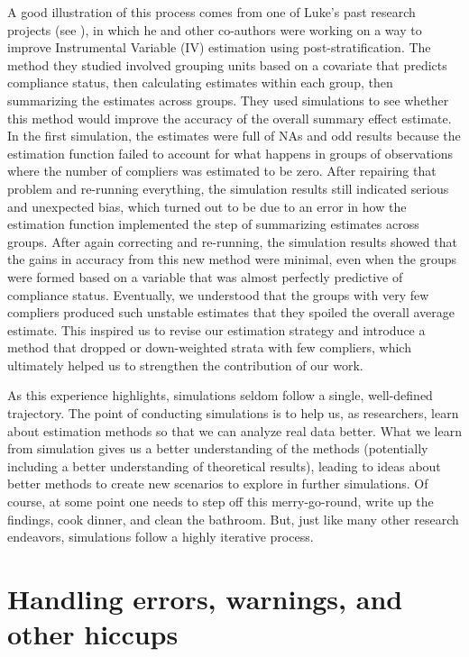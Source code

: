 \documentclass[
]{book}
\begin{document}
A good illustration of this process comes from one of Luke's past research projects (see \citet{pashley2024improving}), in which he and other co-authors were working on a way to improve Instrumental Variable (IV) estimation using post-stratification.
The method they studied involved grouping units based on a covariate that predicts compliance status, then calculating estimates within each group, then summarizing the estimates across groups.
They used simulations to see whether this method would improve the accuracy of the overall summary effect estimate.
In the first simulation, the estimates were full of NAs and odd results because the estimation function failed to account for what happens in groups of observations where the number of compliers was estimated to be zero.
After repairing that problem and re-running everything, the simulation results still indicated serious and unexpected bias, which turned out to be due to an error in how the estimation function implemented the step of summarizing estimates across groups.
After again correcting and re-running, the simulation results showed that the gains in accuracy from this new method were minimal, even when the groups were formed based on a variable that was almost perfectly predictive of compliance status.
Eventually, we understood that the groups with very few compliers produced such unstable estimates that they spoiled the overall average estimate.
This inspired us to revise our estimation strategy and introduce a method that dropped or down-weighted strata with few compliers, which ultimately helped us to strengthen the contribution of our work.

As this experience highlights, simulations seldom follow a single, well-defined trajectory.
The point of conducting simulations is to help us, as researchers, learn about estimation methods so that we can analyze real data better.
What we learn from simulation gives us a better understanding of the methods (potentially including a better understanding of theoretical results), leading to ideas about better methods to create new scenarios to explore in further simulations.
Of course, at some point one needs to step off this merry-go-round, write up the findings, cook dinner, and clean the bathroom.
But, just like many other research endeavors, simulations follow a highly iterative process.

\section{Handling errors, warnings, and other hiccups}\label{handling-errors-warnings-and-other-hiccups}
\end{document}
